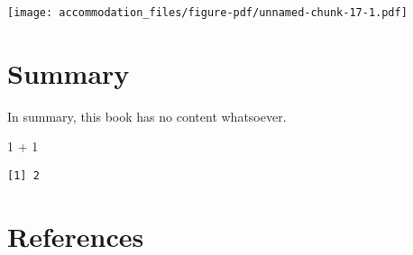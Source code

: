 \documentclass[
  letterpaper,
  DIV=11,
  numbers=noendperiod]{scrreprt}
\newenvironment{Shaded}{\begin{snugshade}}{\end{snugshade}}
\newcommand{\DecValTok}[1]{\textcolor[rgb]{0.68,0.00,0.00}{#1}}
\newcommand{\SpecialCharTok}[1]{\textcolor[rgb]{0.37,0.37,0.37}{#1}}
\newlength{\cslhangindent}
\newenvironment{CSLReferences}[2] %
 {\begin{list}{}{%
  \setlength{\itemindent}{0pt}
  \setlength{\leftmargin}{0pt}
  \setlength{\parsep}{0pt}
  \ifodd #1
   \setlength{\leftmargin}{\cslhangindent}
   \setlength{\itemindent}{-1\cslhangindent}
  \fi
  \setlength{\itemsep}{#2\baselineskip}}}
 {\end{list}}
\begin{document}
\texttt{[image: accommodation\_files/figure-pdf/unnamed-chunk-17-1.pdf]}


\chapter{Summary}\label{summary}

In summary, this book has no content whatsoever.

\begin{Shaded}
\begin{Highlighting}[]
\DecValTok{1} \SpecialCharTok{+} \DecValTok{1}
\end{Highlighting}
\end{Shaded}

\begin{verbatim}
[1] 2
\end{verbatim}


\chapter*{References}\label{references}


\label{refs}
\begin{CSLReferences}{0}{1}
\end{CSLReferences}
\end{document}
